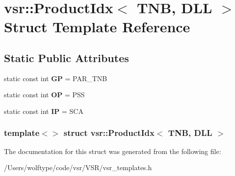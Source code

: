 \hypertarget{structvsr_1_1_product_idx_3_01_t_n_b_00_01_d_l_l_01_4}{\section{vsr\-:\-:Product\-Idx$<$ T\-N\-B, D\-L\-L $>$ Struct Template Reference}
\label{structvsr_1_1_product_idx_3_01_t_n_b_00_01_d_l_l_01_4}
}
\subsection*{Static Public Attributes}
\begin{DoxyCompactItemize}
\item 
\hypertarget{structvsr_1_1_product_idx_3_01_t_n_b_00_01_d_l_l_01_4_abd7f4182bbdde94822f4facf0c04381b}{static const int {\bfseries G\-P} = P\-A\-R\-\_\-\-T\-N\-B}\label{structvsr_1_1_product_idx_3_01_t_n_b_00_01_d_l_l_01_4_abd7f4182bbdde94822f4facf0c04381b}

\item 
\hypertarget{structvsr_1_1_product_idx_3_01_t_n_b_00_01_d_l_l_01_4_aefb22f124e336d7e5cdd8fd9d58e7884}{static const int {\bfseries O\-P} = P\-S\-S}\label{structvsr_1_1_product_idx_3_01_t_n_b_00_01_d_l_l_01_4_aefb22f124e336d7e5cdd8fd9d58e7884}

\item 
\hypertarget{structvsr_1_1_product_idx_3_01_t_n_b_00_01_d_l_l_01_4_a2b33ead01090a0598aa25012558ab537}{static const int {\bfseries I\-P} = S\-C\-A}\label{structvsr_1_1_product_idx_3_01_t_n_b_00_01_d_l_l_01_4_a2b33ead01090a0598aa25012558ab537}

\end{DoxyCompactItemize}
\subsubsection*{template$<$$>$ struct vsr\-::\-Product\-Idx$<$ T\-N\-B, D\-L\-L $>$}



The documentation for this struct was generated from the following file\-:\begin{DoxyCompactItemize}
\item 
/\-Users/wolftype/code/vsr/\-V\-S\-R/vsr\-\_\-templates.\-h\end{DoxyCompactItemize}
